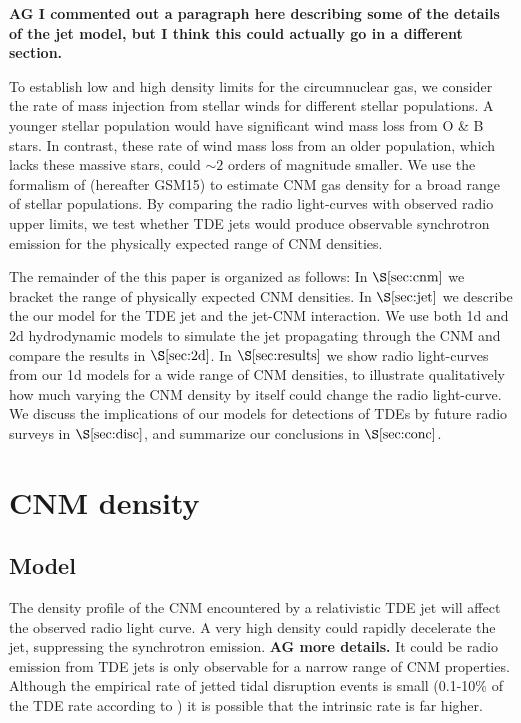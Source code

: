 \documentclass[usenatbib,fleqn]{mnras}
\begin{document}
{\bf AG I commented out a paragraph here describing some of the
  details of the jet model, but I think this could actually go in a
  different section.}

To establish low and high density limits for the circumnuclear gas, we
consider the rate of mass injection from stellar winds for different
stellar populations. A younger stellar population would have
significant wind mass loss from O \& B stars. In contrast, these rate
of wind mass loss from an older population, which lacks these massive
stars, could $\sim 2$ orders of magnitude smaller. We use the
formalism of \citet{Generozov+2015} (hereafter GSM15) to estimate CNM
gas density for a broad range of stellar populations. By comparing the
radio light-curves with observed radio upper limits, we test whether
TDE jets would produce observable synchrotron emission for the
physically expected range of CNM densities.

The remainder of the this paper is organized as follows: In
$\S\ref{sec:cnm}$ we bracket the range of physically expected CNM
densities. In $\S\ref{sec:jet}$ we describe the our model for the TDE
jet and the jet-CNM interaction. We use both 1d and 2d hydrodynamic
models to simulate the jet propagating through the CNM and compare the
results in $\S\ref{sec:2d}$. In $\S\ref{sec:results}$ we show radio
light-curves from our 1d models for a wide range of CNM densities, to
illustrate qualitatively how much varying the CNM density by itself
could change the radio light-curve.  We discuss the implications of
our models for detections of TDEs by future radio surveys in
$\S\ref{sec:disc}$, and summarize our conclusions in
$\S\ref{sec:conc}$.

\section{CNM density}
\label{sec:cnm}

\subsection{Model}

The density profile of the CNM encountered by a relativistic TDE jet
will affect the observed radio light curve. A very high density could
rapidly decelerate the jet, suppressing the synchrotron emission.
{\bf AG more details.}  It could be radio emission from TDE jets is
only observable for a narrow range of CNM properties. Although the
empirical rate of jetted tidal disruption events is small (0.1-10\% of
the TDE rate according to \citealt{van-Velzen+2013}) it is possible
that the intrinsic rate is far higher.
\end{document}
